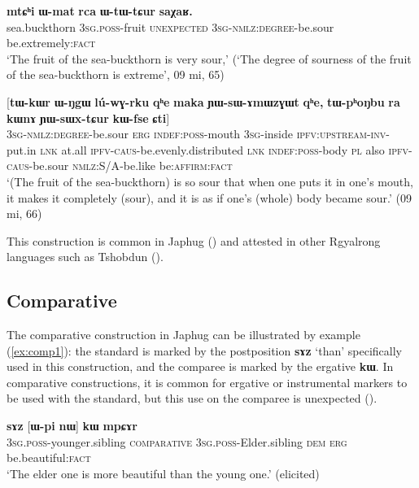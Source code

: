 \documentclass[oneside,a4paper,11pt]{article}
\newcommand{\ipa}[1]{{\phon\textbf{#1}}} %
\begin{document}
\begin{exe}
\ex \label{ex:WtWCur}
\gll 
\ipa{mtɕʰi}  	\ipa{ɯ-mat}  	\ipa{rca}  	\ipa{ɯ-tɯ-tɕur}  	\ipa{saχaʁ.}  	   \\
sea.buckthorn \textsc{3sg.poss}-fruit \textsc{unexpected} \textsc{3sg-nmlz:degree}-be.sour be.extremely:\textsc{fact}   \\
\glt `The fruit of the sea-buckthorn is very sour,' (`The degree of sourness of the fruit of the sea-buckthorn is extreme', 09 mi, 65)
\end{exe}

\begin{exe}
\ex \label{ex:YWsWxtCur}
\gll 
 	[\ipa{ɯ-tɯ-tɕur}]  	\ipa{\textbf{kɯ}}  	[\ipa{tɯ-kɯr}  	\ipa{ɯ-ŋgɯ}  	\ipa{lú-wɣ-rku}  	\ipa{qʰe}  	\ipa{maka}  	\ipa{ɲɯ-sɯ-ɤmɯzɣɯt}  	\ipa{qʰe,}  	\ipa{tɯ-pʰoŋbu}  	\ipa{ra}  	\ipa{kɯnɤ}  	\ipa{ɲɯ-sɯx-tɕur}  	\ipa{kɯ-fse}  	\ipa{ɕti}]  \\
  \textsc{3sg-nmlz:degree}-be.sour \textsc{erg} \textsc{indef:poss}-mouth \textsc{3sg}-inside \textsc{ipfv:upstream-inv}-put.in \textsc{lnk} at.all \textsc{ipfv-caus}-be.evenly.distributed \textsc{lnk} \textsc{indef:poss}-body \textsc{pl} also \textsc{ipfv-caus}-be.sour \textsc{nmlz:S/A}-be.like be:\textsc{affirm}:\textsc{fact} \\
\glt `(The fruit of the sea-buckthorn) is so sour that when one puts it in one's mouth, it makes it completely (sour), and it is as if one's (whole) body became sour.' (09 mi, 66)
\end{exe}

This construction is common in Japhug (\citealt[8]{jacques16comparative}) and attested in other Rgyalrong languages such as Tshobdun (\citealt[911]{jackson06guanxiju}).

\subsection{Comparative}
The comparative construction in Japhug can be illustrated by example (\ref{ex:comp1}): the  standard is marked by the postposition \ipa{sɤz} `than' specifically used in this construction, and the comparee is marked by the ergative  \ipa{kɯ}. In comparative constructions, it is common for ergative or instrumental markers to be used with the standard, but this use on the comparee is unexpected (\citealt{jacques16comparative}).

\begin{exe}
\ex \label{ex:comp1}
\gll  \ipa{ɯ-ʁi}   	\ipa{sɤz}   	[\ipa{ɯ-pi}   	\ipa{nɯ}]   	\ipa{\textbf{kɯ}}   	\ipa{mpɕɤr}     \\
\textsc{3sg.poss}-younger.sibling \textsc{comparative} \textsc{3sg.poss}-Elder.sibling \textsc{dem} \textsc{erg}  be.beautiful:\textsc{fact} \\
\glt `The elder one is more beautiful than the young one.' (elicited)
\end{exe}
\end{document}

